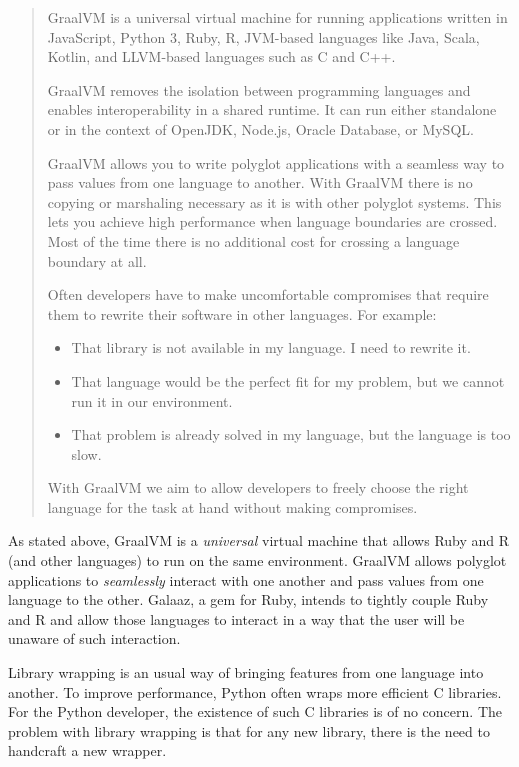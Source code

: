 \documentclass[11pt,]{article}
\providecommand{\tightlist}{%
  \setlength{\itemsep}{0pt}\setlength{\parskip}{0pt}}
\begin{document}
\begin{quote}
GraalVM is a universal virtual machine for running applications written
in JavaScript, Python 3, Ruby, R, JVM-based languages like Java, Scala,
Kotlin, and LLVM-based languages such as C and C++.

GraalVM removes the isolation between programming languages and enables
interoperability in a shared runtime. It can run either standalone or in
the context of OpenJDK, Node.js, Oracle Database, or MySQL.

GraalVM allows you to write polyglot applications with a seamless way to
pass values from one language to another. With GraalVM there is no
copying or marshaling necessary as it is with other polyglot systems.
This lets you achieve high performance when language boundaries are
crossed. Most of the time there is no additional cost for crossing a
language boundary at all.

Often developers have to make uncomfortable compromises that require
them to rewrite their software in other languages. For example:

\begin{itemize}
\tightlist
\item
  That library is not available in my language. I need to rewrite it.
\item
  That language would be the perfect fit for my problem, but we cannot
  run it in our environment.
\item
  That problem is already solved in my language, but the language is too
  slow.
\end{itemize}

With GraalVM we aim to allow developers to freely choose the right
language for the task at hand without making compromises.
\end{quote}

As stated above, GraalVM is a \emph{universal} virtual machine that
allows Ruby and R (and other languages) to run on the same environment.
GraalVM allows polyglot applications to \emph{seamlessly} interact with
one another and pass values from one language to the other. Galaaz, a
gem for Ruby, intends to tightly couple Ruby and R and allow those
languages to interact in a way that the user will be unaware of such
interaction.

Library wrapping is an usual way of bringing features from one language
into another. To improve performance, Python often wraps more efficient
C libraries. For the Python developer, the existence of such C libraries
is of no concern. The problem with library wrapping is that for any new
library, there is the need to handcraft a new wrapper.
\end{document}
